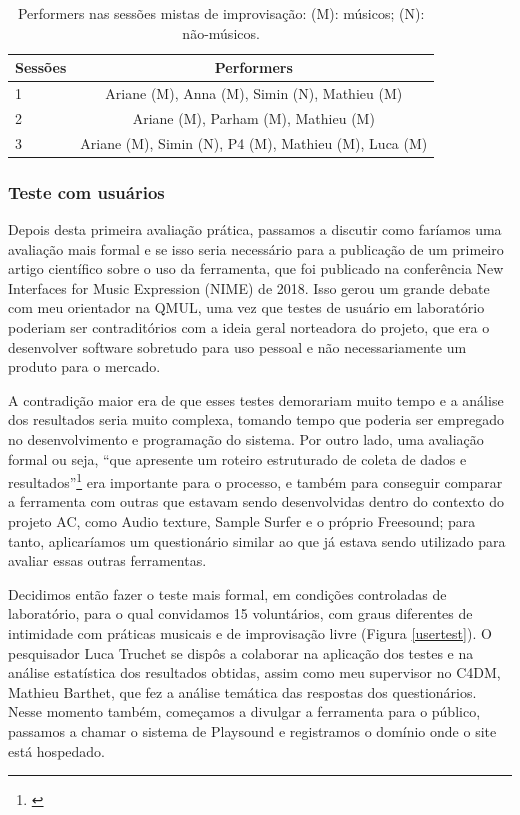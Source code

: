 \begin{table}

\caption{Performers nas sessões mistas de improvisação: (M): músicos; (N): não-músicos.}
\begin{tabular}{|lc|} \hline
Sessões & Performers \\ \hline
1 & Ariane (M), Anna (M), Simin (N), Mathieu (M)\\ \hline
2 & Ariane (M), Parham (M), Mathieu (M) \\ \hline
3 & Ariane (M), Simin (N), P4 (M), Mathieu (M), Luca (M)\\
\hline\end{tabular}
\label{tab:puppets}
\end{table}

\subsubsection{Teste com usuários}

Depois desta primeira avaliação prática, passamos a discutir como faríamos uma avaliação mais formal e se isso seria necessário para a publicação de um primeiro artigo científico sobre o uso da ferramenta, que foi publicado na conferência New Interfaces for Music Expression (NIME) de 2018. Isso gerou um grande debate com meu orientador na QMUL, uma vez que testes de usuário em laboratório poderiam ser contraditórios com a ideia geral norteadora do projeto, que era o desenvolver software sobretudo para uso pessoal e não necessariamente um produto para o mercado. 


A contradição maior era de que esses testes demorariam muito tempo e a análise dos resultados seria muito complexa, tomando tempo que poderia ser empregado no desenvolvimento e programação do sistema. Por outro lado, uma avaliação formal ou seja, ``que apresente um roteiro estruturado de coleta de dados e resultados''\footnote{\cite{Stowell}} era importante para o processo, e também para conseguir comparar a ferramenta com outras que estavam sendo desenvolvidas dentro do contexto do projeto AC, como Audio texture, Sample Surfer e o próprio Freesound; para tanto, aplicaríamos um questionário similar ao que já estava sendo utilizado para avaliar essas outras ferramentas.


Decidimos então fazer o teste mais formal, em condições controladas de laboratório, para o qual convidamos 15 voluntários, com graus diferentes de intimidade com práticas musicais e de improvisação livre (Figura \ref{usertest}). O pesquisador Luca Truchet se dispôs a colaborar na aplicação dos testes e na análise estatística dos resultados obtidas, assim como meu supervisor no C4DM, Mathieu Barthet, que fez a análise temática das respostas dos questionários. Nesse momento também, começamos a divulgar a ferramenta para o público, passamos a chamar o sistema de Playsound e registramos o domínio onde o site está hospedado.


